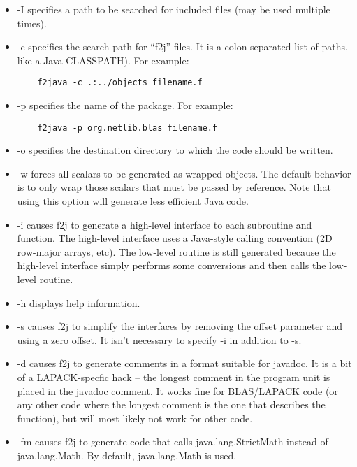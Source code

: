 \documentclass[11pt]{article}
\begin{document}
\begin{itemize}
\item -I specifies a path to be searched for included files (may be used
  multiple times).

\item -c specifies the search path for ``f2j'' files.
  It is a colon-separated list of paths, like a Java CLASSPATH).  For example:
\begin{verbatim}
    f2java -c .:../objects filename.f
\end{verbatim}

\item -p specifies the name of the package.  For example:
\begin{verbatim}
    f2java -p org.netlib.blas filename.f
\end{verbatim}

\item -o specifies the destination directory to which the code should be
  written.

\item -w forces all scalars to be generated as wrapped objects.  The default
  behavior is to only wrap those scalars that must be passed by reference.
  Note that using this option will generate less efficient Java code.

\item -i causes f2j to generate a high-level interface to each subroutine and
  function.  The high-level interface uses a Java-style calling convention (2D
  row-major arrays, etc).  The low-level routine is still generated because the
  high-level interface simply performs some conversions and then calls the
  low-level routine.

\item -h displays help information.

\item -s causes f2j to simplify the interfaces by removing the offset parameter and
  using a zero offset.  It isn't necessary to specify -i in addition to -s.

\item -d causes f2j to generate comments in a format suitable for javadoc.  It is a
  bit of a LAPACK-specfic hack -- the longest comment in the program unit is
  placed in the javadoc comment.  It works fine for BLAS/LAPACK code (or any
  other code where the longest comment is the one that describes the function),
  but will most likely not work for other code.

\item -fm causes f2j to generate code that calls java.lang.StrictMath
  instead of java.lang.Math.  By default, java.lang.Math is used.


\end{itemize}
\end{document}
